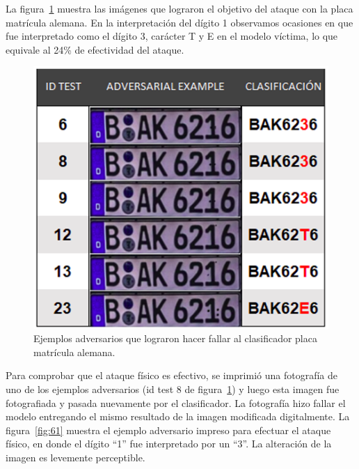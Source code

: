 La figura~\ref{fig:60} muestra las imágenes que lograron el objetivo del ataque con la placa matrícula alemana. En la interpretación del dígito 1 observamos ocasiones en que fue interpretado como el dígito 3, carácter T y E en el modelo víctima, lo que equivale al 24\% de efectividad del ataque. 

 \begin{figure}[!h]
    \centering
    \includegraphics[scale = 1.1]{Figures/figura_60.PNG}
    \decoRule
    \caption[Ejemplos adversarios placa matrícula alemana]{Ejemplos adversarios que lograron hacer fallar al clasificador placa matrícula alemana.}
    \label{fig:60}
\end{figure}

Para comprobar que el ataque físico es efectivo, se imprimió una fotografía de uno de los ejemplos adversarios (id test 8 de figura~\ref{fig:60}) y luego esta imagen fue fotografiada y pasada nuevamente por el clasificador. La fotografía hizo fallar el modelo entregando el mismo resultado de la imagen modificada digitalmente. La figura~\ref{fig:61} muestra el ejemplo adversario impreso para efectuar el ataque físico, en donde el dígito “1” fue interpretado por un “3”. La alteración de la imagen es levemente perceptible.

